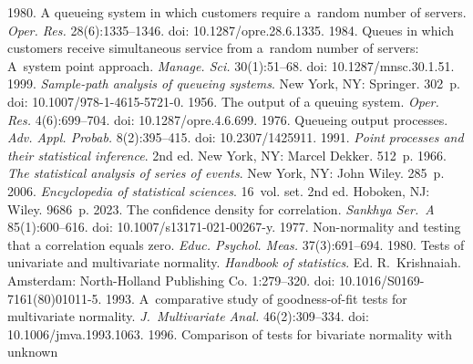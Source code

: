   \begin{multicols}{2}

\renewcommand{\bibname}{\protect\rmfamily References}

{\small\frenchspacing
 {%
 \begin{thebibliography}{99} 
 1980. A queueing system in which customers require a~random number 
of servers. \textit{Oper. Res.} 28(6):1335--1346. doi: 10.1287/opre.28.6.1335.
 1984. Queues in which customers receive 
simultaneous service from a~random number of servers: A~system point approach. 
\textit{Manage. Sci.} 30(1):51--68. doi: 10.1287/mnsc.30.1.51.
 1999. \textit{Sample-path analysis of queueing 
systems}. New York, NY: Springer. 302~p. doi: 10.1007/978-1-4615-5721-0.
 1956. The output of a queuing system. \textit{Oper. Res.} 
4(6):699--704. doi: 10.1287/opre.4.6.699.
 1976. Queueing output processes. \textit{Adv. Appl. Probab.} 
8(2):395--415. doi: 10.2307/1425911.
 1991. \textit{Point processes and their statistical inference}. 2nd ed. 
New York, NY: Marcel Dekker. 512~p.
 1966. \textit{The statistical analysis of series 
of events}. New York, NY: John Wiley. 285~p.
 2006. 
\textit{Encyclopedia of statistical sciences}. 16~vol. set. 2nd ed. Hoboken, NJ: Wiley. 
9686~p.
 2023. The confidence density for correlation. \textit{Sankhya Ser.~A} 85(1):600--616. doi: 10.1007/s13171-021-00267-y.
 1977. Non-normality and testing that a correlation equals zero. 
\textit{Educ. Psychol. Meas.} 37(3):691--694. 
 1980. Tests of univariate and multivariate normality. 
\textit{Handbook of statistics}. Ed. R.~Krishnaiah. Amsterdam: North-Holland 
Publishing Co. 1:279--320. doi: 10.1016/S0169-7161(80)01011-5.
 1993. A~comparative study of goodness-of-fit tests 
for multivariate normality. \textit{J.~Multivariate Anal.} 46(2):309--334. doi: 
10.1006/\linebreak jmva.1993.1063.
 1996. Comparison of tests for bivariate normality with unknown 

\end{thebibliography}}}
\end{multicols}

